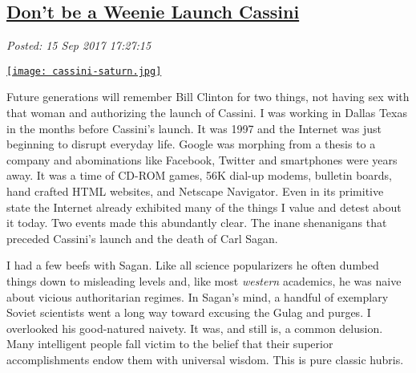 %

\subsection*{\href{http://analyzethedatanotthedrivel.org/2017/09/15/dont-be-a-weenie-launch-cassini/}{Don't be a Weenie Launch Cassini}}


\noindent\emph{Posted: 15 Sep 2017 17:27:15}
\vspace{6pt}


 \captionsetup[floatingfigure]{labelformat=empty}
 \begin{floatingfigure}[l]{0.25\textwidth}
 \centering
 \href{https://bakerjd99.files.wordpress.com/2017/09/cassini-saturn.jpg}{\texttt{[image: cassini-saturn.jpg]}}
 \label{fig:5466x0}
 \end{floatingfigure} Future
generations will remember Bill Clinton for two things, not having sex
with that woman and authorizing the launch of Cassini. I was working in
Dallas Texas in the months before Cassini's launch. It was 1997 and the
Internet was just beginning to disrupt everyday life. Google was
morphing from a thesis to a company and abominations like Facebook,
Twitter and smartphones were years away. It was a time of CD-ROM games,
56K dial-up modems, bulletin boards, hand crafted HTML websites, and
Netscape Navigator. Even in its primitive state the Internet already
exhibited many of the things I value and detest about it today. Two events
made this abundantly clear. The inane shenanigans that preceded
Cassini's launch and the death of Carl Sagan.

I had a few beefs with Sagan. Like all science popularizers he often
dumbed things down to misleading levels and, like most \emph{western}
academics, he was naive about vicious authoritarian regimes. In Sagan's
mind, a handful of exemplary Soviet scientists went a long way toward
excusing the Gulag and purges. I overlooked his good-natured naivety. It
was, and still is, a common delusion. Many intelligent people fall
victim to the belief that their superior accomplishments endow them with
universal wisdom. This is pure classic hubris.


